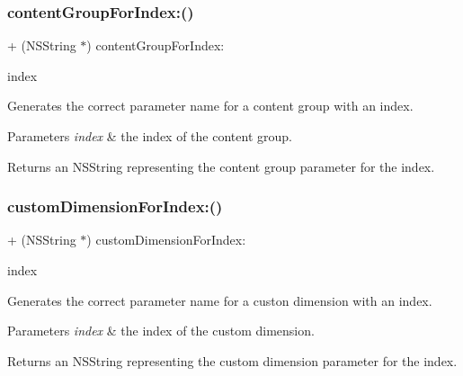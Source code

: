 \subsubsection{\texorpdfstring{content\+Group\+For\+Index\+:()}{contentGroupForIndex:()}}
{\footnotesize\ttfamily + (N\+S\+String $\ast$) content\+Group\+For\+Index\+: \begin{DoxyParamCaption}\item[{(N\+S\+U\+Integer)}]{index }\end{DoxyParamCaption}}

Generates the correct parameter name for a content group with an index.


\begin{DoxyParams}{Parameters}
{\em index} & the index of the content group.\\
\hline
\end{DoxyParams}
\begin{DoxyReturn}{Returns}
an N\+S\+String representing the content group parameter for the index. 
\end{DoxyReturn}
\mbox{\label{interface_g_a_i_fields_a70d997a1372757a3f5b243d7274a73dd}} 
\subsubsection{\texorpdfstring{custom\+Dimension\+For\+Index\+:()}{customDimensionForIndex:()}}
{\footnotesize\ttfamily + (N\+S\+String $\ast$) custom\+Dimension\+For\+Index\+: \begin{DoxyParamCaption}\item[{(N\+S\+U\+Integer)}]{index }\end{DoxyParamCaption}}

Generates the correct parameter name for a custon dimension with an index.


\begin{DoxyParams}{Parameters}
{\em index} & the index of the custom dimension.\\
\hline
\end{DoxyParams}
\begin{DoxyReturn}{Returns}
an N\+S\+String representing the custom dimension parameter for the index. 
\end{DoxyReturn}
\mbox{\label{interface_g_a_i_fields_a2f02ddf6c9e6055ef41af6f1b98d872e}} 
